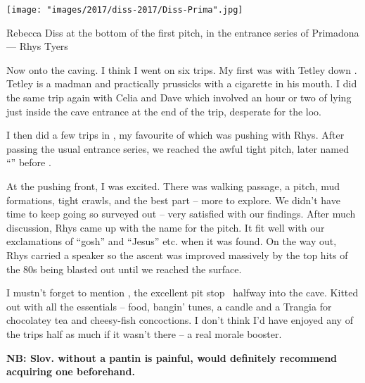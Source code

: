 \begin{marginfigure}
\end{marginfigure}


\begin{marginfigure} \centering
\texttt{[image: "images/2017/diss-2017/Diss-Prima".jpg]}
\caption{Rebecca Diss at the bottom of the first pitch, in the entrance series of Primadona --- Rhys Tyers}
\end{marginfigure}
 
Now onto the caving. I think I went on six trips. My first was with Tetley down . Tetley is a madman and practically prussicks with a cigarette in his mouth. I did the same trip again with Celia and Dave which involved an hour or two of lying just inside the cave entrance at the end of the trip, desperate for the loo.

I then did a few trips in , my favourite of which was pushing  with Rhys. After passing the usual entrance series, we reached the awful tight pitch, later named “” before . 



At the pushing front, I was excited. There was walking passage, a pitch, mud formations, tight crawls, and the best part – more to explore. We didn’t have time to keep going so surveyed out – very satisfied with our findings. After much discussion, Rhys came up with the name  for the pitch. It fit well with our exclamations of “gosh” and “Jesus” etc. when it was found. On the way out, Rhys carried a speaker so the ascent was improved massively by the top hits of the 80s being blasted out until we reached the surface.

I mustn’t forget to mention , the excellent pit stop ~halfway into the cave. Kitted out with all the essentials – food, bangin’ tunes, a candle and a Trangia for chocolatey tea and cheesy-fish concoctions. I don’t think I’d have enjoyed any of the trips half as much if it wasn’t there – a real morale booster.

\textbf{NB: Slov. without a pantin is painful, would definitely recommend acquiring one beforehand.
}

